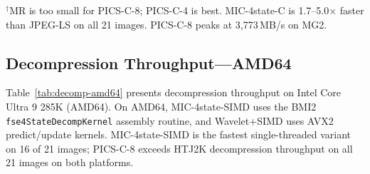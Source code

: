 \documentclass[journal]{IEEEtran}
\begin{document}
$^\dagger$MR is too small for PICS-C-8; PICS-C-4 is best.
MIC-4state-C is 1.7--5.0$\times$ faster than JPEG-LS on all 21 images.
PICS-C-8 peaks at 3,773\,MB/s on MG2.

\subsection{Decompression Throughput---AMD64}

Table~\ref{tab:decomp-amd64} presents decompression throughput on Intel Core
Ultra 9 285K (AMD64). On AMD64, MIC-4state-SIMD uses the BMI2
\texttt{fse4StateDecompKernel} assembly routine, and Wavelet+SIMD uses AVX2
predict/update kernels. MIC-4state-SIMD is the fastest single-threaded variant
on 16 of 21 images; PICS-C-8 exceeds HTJ2K decompression throughput on all
21 images on both platforms.
\end{document}
